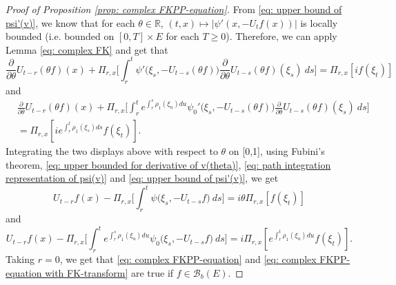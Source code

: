 \documentclass[12pt,a4paper]{amsart}
\theoremstyle{plain}
\theoremstyle{definition}
\numberwithin{equation}{section}
\begin{document}
\begin{proof}[Proof of Proposition \ref{prop: complex FKPP-equation}]
 From \eqref{eq: upper bound of psi'(v)}, we know that for each $\theta\in \mathbb R$, $(t,x) \mapsto |\psi'(x,-U_tf(x))|$ is locally bounded (i.e. bounded on $[0,T]\times E$ for each $T \geq 0$).
Therefore, we can apply Lemma \ref{eq: complex FK} and get that
\[
  \frac{\partial}{\partial \theta} U_{t-r}(\theta f)(x) + \Pi_{r,x} \Big[\int_r^t \psi'\big(\xi_s,- U_{t-s}(\theta f)\big)\frac{\partial}{\partial \theta} U_{t-s}(\theta f)(\xi_s)~ds\Big]
  = \Pi_{r,x} [i f(\xi_t)]
\]
and
\begin{align}
  & \frac{\partial}{\partial \theta} U_{t-r}(\theta f)(x) + \Pi_{r,x} \Big[\int_r^t e^{\int_r^s \rho_1(\xi_u)du}\psi_0'\big(\xi_s,- U_{t-s}(\theta f)\big)\frac{\partial}{\partial \theta} U_{t-s}(\theta f)(\xi_s)~ds\Big]\\
  & = \Pi_{r,x} [i e^{\int_r^t \rho_1(\xi_s)ds}f(\xi_t)].
\end{align}
Integrating the two displays above with respect to $\theta$  on [0,1], using 
Fubini's theorem, \eqref{eq: upper bounded for derivative of v(theta)}, \eqref{eq: path integration representation of psi(v)} and \eqref{eq: upper bound of psi'(v)}, we get
\begin{equation}
  U_{t-r}f(x) - \Pi_{r,x} \Big[\int_r^t \psi\big(\xi_s,-U_{t-s}f\big) ~ds\Big]
  = i \theta \Pi_{r,x} [f(\xi_t)]
\end{equation}
and
\begin{equation}
  U_{t-r}f(x) - \Pi_{r,x} \Big[\int_r^t e^{\int_r^s \rho_1(\xi_u)du} \psi_0\big(\xi_s,- U_{t-s}f\big) ~ds\Big]
  = i \Pi_{r,x} [e^{\int_r^t\rho_1(\xi_u)du}f(\xi_t)].
\end{equation}
Taking $r = 0$, we get that \eqref{eq: complex FKPP-equation} and \eqref{eq: complex FKPP-equation with FK-transform} are true if $f\in \mathcal B_b(E)$.


\end{proof}
\end{document}
